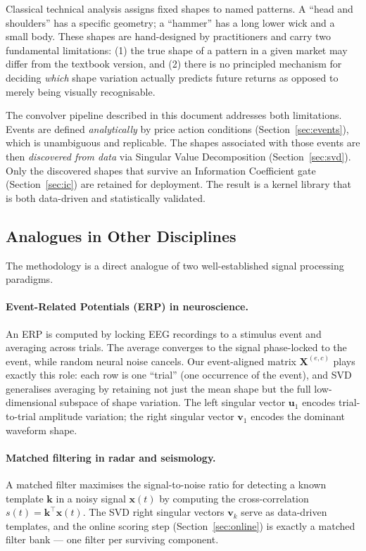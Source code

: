 \documentclass[11pt,a4paper]{article}
\theoremstyle{definition}
\theoremstyle{plain}
\newcommand{\Xmat}{\mathbf{X}}
\newcommand{\bvec}[1]{\mathbf{#1}}
\begin{document}
Classical technical analysis assigns fixed shapes to named patterns. A ``head and
shoulders'' has a specific geometry; a ``hammer'' has a long lower wick and a small body.
These shapes are hand-designed by practitioners and carry two fundamental limitations:
(1) the true shape of a pattern in a given market may differ from the textbook version,
and (2) there is no principled mechanism for deciding \emph{which} shape variation
actually predicts future returns as opposed to merely being visually recognisable.

The convolver pipeline described in this document addresses both limitations. Events are
defined \emph{analytically} by price action conditions (Section~\ref{sec:events}), which
is unambiguous and replicable. The shapes associated with those events are then
\emph{discovered from data} via Singular Value Decomposition (Section~\ref{sec:svd}).
Only the discovered shapes that survive an Information Coefficient gate
(Section~\ref{sec:ic}) are retained for deployment. The result is a kernel library that
is both data-driven and statistically validated.

\subsection{Analogues in Other Disciplines}

The methodology is a direct analogue of two well-established signal processing paradigms.

\paragraph{Event-Related Potentials (ERP) in neuroscience.}
An ERP is computed by locking EEG recordings to a stimulus event and averaging across
trials. The average converges to the signal phase-locked to the event, while random
neural noise cancels. Our event-aligned matrix $\Xmat^{(e,c)}$ plays exactly this role:
each row is one ``trial'' (one occurrence of the event), and SVD generalises averaging by
retaining not just the mean shape but the full low-dimensional subspace of shape
variation. The left singular vector $\bvec{u}_1$ encodes trial-to-trial amplitude
variation; the right singular vector $\bvec{v}_1$ encodes the dominant waveform shape.

\paragraph{Matched filtering in radar and seismology.}
A matched filter maximises the signal-to-noise ratio for detecting a known template
$\bvec{k}$ in a noisy signal $\bvec{x}(t)$ by computing the cross-correlation
$s(t) = \bvec{k}^\top \bvec{x}(t)$. The SVD right singular vectors $\bvec{v}_k$ serve
as data-driven templates, and the online scoring step (Section~\ref{sec:online}) is
exactly a matched filter bank --- one filter per surviving component.
\end{document}
